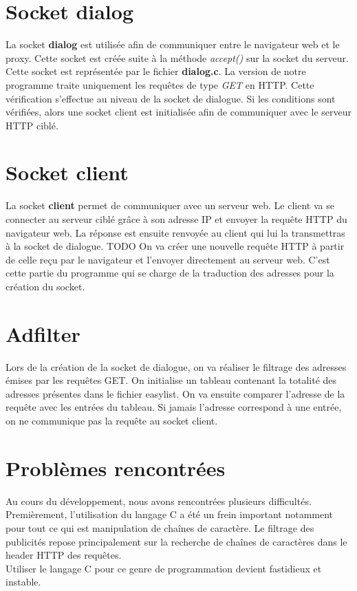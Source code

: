 \documentclass[a4paper,11pt, oneside]{book}
\def\todo{{\color{red}\Huge{TODO}}}
\begin{document}
		\section{Socket dialog}

			La socket \textbf{dialog} est utilisée afin de communiquer entre le navigateur web et le proxy. Cette socket est créée
			suite à la méthode \textit{accept()} sur la socket du serveur. Cette socket est représentée par le fichier \textbf{dialog.c}.
			La version de notre programme traite uniquement les requêtes de type \textit{GET} en HTTP. Cette vérification s'effectue au niveau de la socket
			de dialogue. Si les conditions sont vérifiées, alors une socket client est initialisée afin de communiquer avec le serveur HTTP ciblé.

		\section{Socket client}

			La socket \textbf{client} permet de communiquer avec un serveur web. Le client va se connecter au serveur ciblé grâce à son adresse IP
			et envoyer la requête HTTP du navigateur web. La réponse est ensuite renvoyée
			au client qui lui la transmettras à la socket de dialogue.
			\todo
			On va créer une nouvelle requête HTTP à partir de celle reçu par le navigateur et l'envoyer directement au serveur web.
			C'est cette partie du programme qui se charge de la traduction des adresses pour la création du socket.

		\section{Adfilter}

			Lors de la création de la socket de dialogue, on va réaliser le filtrage des adresses émises par les requêtes GET.
			On initialise un tableau contenant la totalité des adresses présentes dans le fichier easylist. On va ensuite comparer l'adresse de
			la requête avec les entrées du tableau. Si jamais l'adresse correspond à une entrée, on ne communique pas la requête au socket client.

		\section{Problèmes rencontrées}

			Au cours du développement, nous avons rencontrées plusieurs difficultés.
			Premièrement, l'utilisation du langage C a été un frein important notamment pour tout ce qui est
			manipulation de chaînes de caractère.
			Le filtrage des publicités repose principalement sur la recherche de chaînes de caractères dans le header HTTP des requêtes.\\
			Utiliser le langage C pour ce genre de programmation devient fastidieux et instable.
\end{document}
